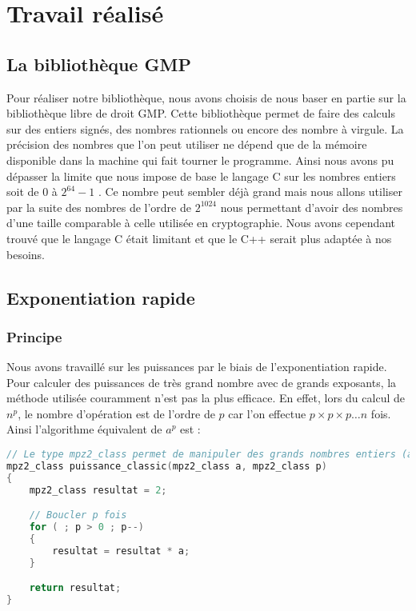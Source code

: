 \chapter{Travail réalisé}
\section{La bibliothèque GMP}
Pour réaliser notre bibliothèque, nous avons choisis de nous baser en partie sur la bibliothèque libre de droit GMP. Cette bibliothèque permet de faire des calculs sur des entiers signés, des nombres rationnels ou encore des nombre à virgule. La précision des nombres que l’on peut utiliser ne dépend que de la mémoire disponible dans la machine qui fait tourner le programme. Ainsi nous avons pu dépasser la limite que nous impose de base le langage C sur les nombres entiers soit de $0$ à $2^{64}-1$ . Ce nombre peut sembler déjà grand mais nous allons utiliser par la suite des nombres de l’ordre de $2^{1024}$ nous permettant d’avoir des nombres d’une taille comparable à celle utilisée en cryptographie. Nous avons cependant trouvé que le langage C était limitant et que le C++ serait plus adaptée à nos besoins. 


\section{Exponentiation rapide}
\subsection{Principe}
Nous avons travaillé sur les puissances par le biais de l’exponentiation rapide. Pour calculer des puissances de très grand nombre avec de grands exposants, la méthode utilisée couramment n’est pas la plus efficace. En effet, lors du calcul de $n^p$, le nombre d’opération est de l’ordre de $p$ car l’on effectue $p\times p\times p \dotso n$ fois. Ainsi l'algorithme équivalent de $a^p$ est :

\begin{lstlisting}[language=C++]
// Le type mpz2_class permet de manipuler des grands nombres entiers (avec GMP)
mpz2_class puissance_classic(mpz2_class a, mpz2_class p)
{
    mpz2_class resultat = 2;

    // Boucler p fois
    for ( ; p > 0 ; p--)
    {
        resultat = resultat * a;
    }

    return resultat;
}
\end{lstlisting}

